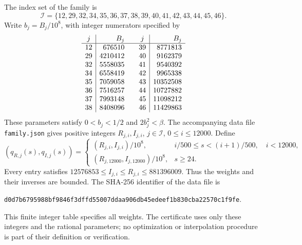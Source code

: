 \documentclass[11pt]{article}
\theoremstyle{remark}\newtheorem{remark}[theorem]{Remark}
\begin{document}
The index set of the family is
\[
\mathcal I=\{12,29,32,34,35,36,37,38,39,40,41,42,43,44,45,46\}.
\]
Write \(b_j=B_j/10^8\), with integer numerators specified by
\[
\begin{array}{c|r@{\qquad}c|r}
j&B_j&j&B_j\\\hline
12&676510&39&8771813\\
29&4210412&40&9162379\\
32&5558035&41&9540392\\
34&6558419&42&9965338\\
35&7059058&43&10352508\\
36&7516257&44&10727882\\
37&7993148&45&11098212\\
38&8408096&46&11429863
\end{array}
\]
These parameters satisfy \(0<b_j<1/2\) and \(2b_j^2<\beta\).
The accompanying data file \texttt{family.json} gives positive
integers \(R_{j,i},I_{j,i}\), \(j\in\mathcal I\),
\(0\le i\le12000\). Define
\begin{equation}\label{eq:weights}
(q_{R,j}(s),q_{I,j}(s))=
\begin{cases}
(R_{j,i},I_{j,i})/10^8,&i/500\le s<(i+1)/500,\quad i<12000,\\
(R_{j,12000},I_{j,12000})/10^8,&s\ge24.
\end{cases}
\end{equation}
Every entry satisfies
\(12576853\le I_{j,i}\le R_{j,i}\le881396009\).
Thus the weights and their inverses are bounded. The SHA-256
identifier of the data file is
\begin{center}\small\texttt{d0d7b6795988bf9846f3dffd55007ddaa906db45edeef1b830cba22570c1f9fe}.
\end{center}
This finite integer table specifies all weights. The certificate uses
only these integers and the rational parameters; no optimization or
interpolation procedure is part of their definition or verification.
\end{document}
